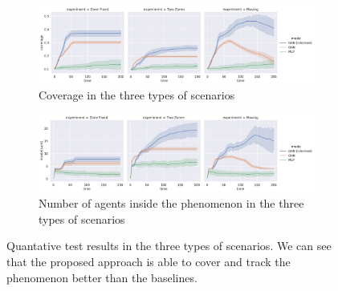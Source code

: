 \documentclass[conference]{IEEEtran}
\begin{document}
\begin{figure}
  \centering
  \begin{subfigure}[b]{0.9\linewidth}
    \includegraphics[width=\linewidth]{imgs/coverage-test.pdf}
    \caption{Coverage in the three types of scenarios}
    \label{fig:coverage-test}
  \end{subfigure}
  \begin{subfigure}[b]{0.9\linewidth}
    \includegraphics[width=\linewidth]{imgs/inside-test}
    \caption{Number of agents inside the phenomenon in the three types of scenarios}
    \label{fig:inside-test}
  \end{subfigure}
	\caption{Quantative test results in the three types of scenarios.
	 	We can see that the proposed approach is able to cover and track the phenomenon better than the baselines.
	}
	\label{fig:test}
\end{figure}
\end{document}
